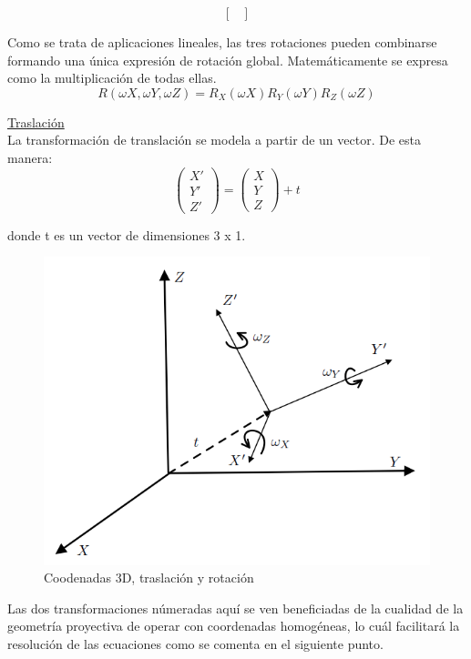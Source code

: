 \documentclass[a4,10pt]{article}
\begin{document}
\begin{enumerate}
\begin{equation}
\begin{bmatrix}
\end{bmatrix}
\end{equation}

Como se trata de aplicaciones lineales, las tres rotaciones pueden combinarse formando una única expresión de rotación global. Matemáticamente se expresa como la multiplicación de todas ellas.\\
\begin{equation}
R (\omega X , \omega Y , \omega Z ) = R_X (\omega X ) R_Y (\omega Y ) R_Z (\omega Z )
\end{equation}

\underline{Traslación}\\
La transformación de translación se modela a partir de un vector. De esta manera:\\
\begin{equation}
\begin{pmatrix}
X'\\
Y'\\
Z'
\end{pmatrix}
=
\begin{pmatrix}
X\\
Y\\
Z
\end{pmatrix}
+ t
\end{equation}

donde t es un vector de dimensiones 3 x 1.\\
\begin{figure}
\begin{center}
\includegraphics[width=0.6\linewidth]{images/figura1}
\end{center}
\caption{Coodenadas 3D, traslación y rotación}
\label{fig:figura1}
\end{figure}
Las dos transformaciones númeradas aquí se ven beneficiadas de la cualidad de la geometría proyectiva de operar con coordenadas homogéneas, lo cuál facilitará la resolución de las ecuaciones como se comenta en el siguiente punto.


\end{enumerate}
\end{document}
